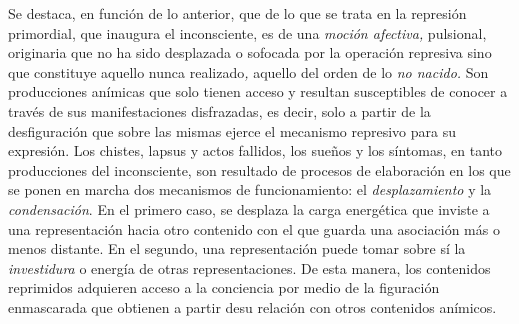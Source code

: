 \documentclass{book}
\begin{document}
Se destaca, en función de lo anterior, que de lo que se trata en la
represión primordial, que inaugura el inconsciente, es de una
\emph{moción afectiva,} pulsional, originaria que no ha sido desplazada
o sofocada por la operación represiva sino que constituye aquello nunca
realizado\emph{,} aquello del orden de lo \emph{no nacido.} Son
producciones anímicas que solo tienen acceso y resultan susceptibles de
conocer a través de sus manifestaciones disfrazadas, es decir, solo a
partir de la desfiguración que sobre las mismas ejerce el mecanismo
represivo para su expresión. Los chistes, lapsus y actos fallidos, los
sueños y los síntomas, en tanto producciones del inconsciente, son
resultado de procesos de elaboración en los que se ponen en marcha dos
mecanismos de funcionamiento: el \emph{desplazamiento} y la
\emph{condensación}. En el primero caso, se desplaza la carga energética
que inviste a una representación hacia otro contenido con el que guarda
una asociación más o menos distante. En el segundo, una representación
puede tomar sobre sí la \emph{investidura} o energía de otras
representaciones. De esta manera, los contenidos reprimidos adquieren
acceso a la conciencia por medio de la figuración enmascarada que
obtienen a partir desu relación con otros contenidos anímicos.
\end{document}
